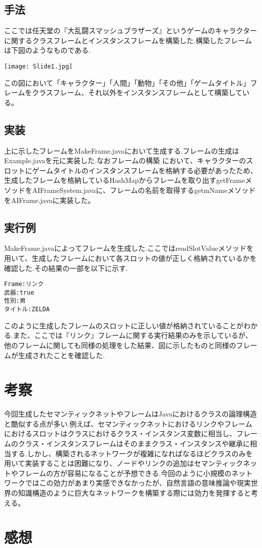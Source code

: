 \documentclass[a4j]{jarticle}
\begin{document}
\subsection{手法}
ここでは任天堂の『大乱闘スマッシュブラザーズ』というゲームのキャラクターに関するクラスフレームとインスタンスフレームを構築した.構築したフレームは下図のようなものである.


\texttt{[image: Slide1.jpg]}

この図において「キャラクター」「人間」「動物」「その他」「ゲームタイトル」フレームをクラスフレーム、それ以外をインスタンスフレームとして構築している。


\subsection{実装}
上に示したフレームをMakeFrame.javaにおいて生成する.フレームの生成はExample.javaを元に実装した.なおフレームの構築
において、キャラクターのスロットにゲームタイトルのインスタンスフレームを格納する必要があったため、生成したフレームを格納しているHashMapからフレームを取り出すgetFrameメソッドをAIFrameSystem.javaに、フレームの名前を取得するgetmNameメソッドをAIFrame.javaに実装した。
\subsection{実行例}
MakeFrame.javaによってフレームを生成した.ここではreadSlotValueメソッドを用いて、生成したフレームにおいて各スロットの値が正しく格納されているかを確認した.その結果の一部を以下に示す.
\\

\begin{screen}
\begin{verbatim}
Frame:リンク
武器:true
性別:男
タイトル:ZELDA
\end{verbatim}
\end{screen}

このように生成したフレームのスロットに正しい値が格納されていることがわかる.また、ここでは『リンク』フレームに関する実行結果のみを示しているが、他のフレームに関しても同様の処理をした結果、図に示したものと同様のフレームが生成されたことを確認した.

\section{考察}
今回生成したセマンティックネットやフレームはJavaにおけるクラスの論理構造と酷似する点が多い.例えば、セマンティックネットにおけるリンクやフレームにおけるスロットはクラスにおけるクラス・インスタンス変数に相当し、フレームのクラス・インスタンスフレームはそのままクラス・インスタンスや継承に相当する.しかし、構築されるネットワークが複雑になればなるほどクラスのみを用いて実装することは困難になり、ノードやリンクの追加はセマンティックネットやフレームの方が容易になることが予想できる.今回のように小規模のネットワークではこの効力があまり実感できなかったが、自然言語の意味推論や現実世界の知識構造のように巨大なネットワークを構築する際には効力を発揮すると考える。

\section{感想}
\end{document}
